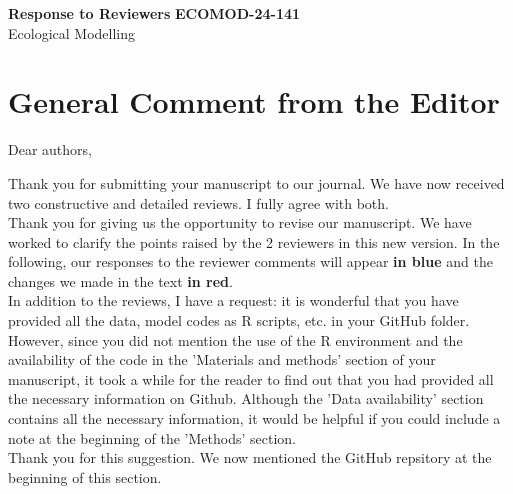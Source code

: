 \documentclass[a4paper, 11pt]{article}
\begin{document}
\noindent
\large\textbf{Response to Reviewers} \hfill \textbf{ECOMOD-24-141} \\
\normalsize Ecological Modelling \hfill \textit{} \\

\noindent\hrulefill
\tableofcontents
\noindent\hrulefill

\renewcommand*\thetable{R\arabic{table}}
\renewcommand*\thefigure{R\arabic{figure}}


\newcommand{\textappr}{\raisebox{0.5ex}{\texttildelow}}

\section{General Comment from the Editor}

Dear authors,

\noindent Thank you for submitting your manuscript to our journal. We have now received two constructive and detailed reviews. I fully agree with both. \\
\textcolor{customblue}{Thank you for giving us the opportunity to revise our manuscript. We have worked to clarify the points raised by the 2 reviewers in this new version. In the following, our responses to the reviewer comments will appear \textbf{in blue} and the changes we made in the text \textbf{\textcolor{customred}{in red}}.}\\


\noindent In addition to the reviews, I have a request: it is wonderful that you have provided all the data, model codes as R scripts, etc. in your GitHub folder. However, since you did not mention the use of the R environment and the availability of the code in the 'Materials and methods' section of your manuscript, it took a while for the reader to find out that you had provided all the necessary information on Github. Although the 'Data availability' section contains all the necessary information, it would be helpful if you could include a note at the beginning of the 'Methods' section.\\
\textcolor{customblue}{Thank you for this suggestion. We now mentioned the GitHub repsitory at the beginning of this section.}\\

\clearpage
\end{document}
